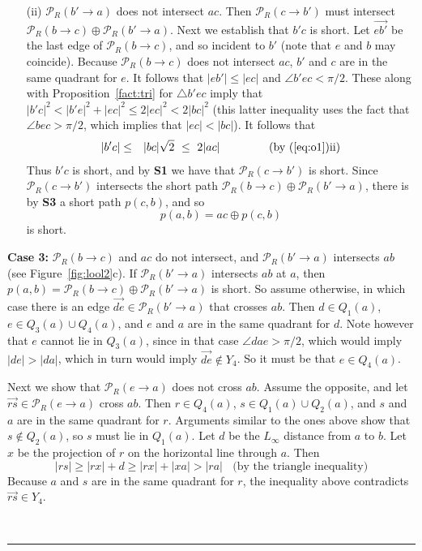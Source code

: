 \pdfoutput=1  \documentclass[11pt]{article}
\newcommand{\qed}{\rule{0.5em}{1.5ex}}
\newcommand{\fqed}{{\hfill~\qed}}
\newenvironment{proof}{{\noindent \bf Proof.}}
                      {{\hfill \fqed} \vspace{1em}}
\newcommand{\Pa}{{\mathcal P}}
\begin{document}
\begin{proof}
\begin{enumerate}
\item[(ii)] $\Pa_R(b' \rightarrow a)$ does not intersect $ac$.
Then $\Pa_R(c \rightarrow b')$ must intersect
$\Pa_R(b \rightarrow c) \oplus \Pa_R(b' \rightarrow a)$.
Next we establish that $b'c$ is short. Let $\overrightarrow{eb'}$ be the last edge
of $\Pa_R(b \rightarrow c)$, and so incident to $b'$
(note that $e$ and $b$ may coincide). Because $\Pa_R(b \rightarrow c)$ does not intersect
$ac$, $b'$ and $c$ are in the same quadrant for $e$. It follows that
$|eb'| \le |ec|$ and $\angle{b'ec} < \pi/2$.
These along with
Proposition~\ref{fact:tri}
for $\triangle b'ec$ imply that
$|b'c|^2 < |b'e|^2 + |ec|^2 \le 2|ec|^2 < 2|bc|^2$ (this latter inequality
uses the fact that $\angle{bec} > \pi/2$, which implies that $|ec| < |bc|$).
It follows that
\begin{eqnarray}
 |b'c| & \le & |bc| \sqrt{2} ~\le ~2|ac| ~~~~~~~~~~~~~\mbox{(by~(\ref{eq:o1})ii)}
\label{eq:o4a}
\end{eqnarray}
Thus $b'c$ is short, and by {\bf S1} we have that $\Pa_R(c \rightarrow b')$ is short.
Since $\Pa_R(c \rightarrow b')$ intersects the short path
$\Pa_R(b \rightarrow c) \oplus \Pa_R(b' \rightarrow a)$,
there is by {\bf S3} a short path $p(c,b)$, and so
$$
p(a,b) = ac \oplus p(c,b)
$$
is short.

\end{enumerate}

\medskip
\noindent
{\bf Case 3:} $\Pa_R(b \rightarrow c)$ and $ac$ do not intersect,
and $\Pa_R(b' \rightarrow a)$ intersects $ab$ (see Figure~\ref{fig:lool2}c).
If $\Pa_R(b' \rightarrow a)$ intersects $ab$ at $a$, then
$p(a,b) = \Pa_R(b \rightarrow c) \oplus \Pa_R(b' \rightarrow a)$ is short.
So assume otherwise, in which case
there is an edge $\overrightarrow{de} \in \Pa_R(b' \rightarrow a)$ that
crosses $ab$.
Then $d \in Q_1(a)$, $e \in Q_3(a) \cup Q_4(a)$, and $e$ and $a$ are in
the same quadrant for $d$. Note however that $e$ cannot lie in
$Q_3(a)$, since in that case $\angle{dae} > \pi/2$, which would imply
$|de| > |da|$, which in turn would imply $\overrightarrow{de} \notin Y_4$.
So it must be that $e \in Q_4(a)$.

Next we show that $\Pa_R(e \rightarrow a)$ does not cross $ab$. Assume the opposite,
and let $\overrightarrow{rs} \in \Pa_R(e \rightarrow a)$ cross $ab$. Then
$r \in Q_4(a)$, $s \in Q_1(a) \cup Q_2(a)$, and $s$ and $a$ are in
the same quadrant for $r$. Arguments similar to the ones above show that
$s \notin Q_2(a)$, so $s$ must lie in $Q_1(a)$. Let $d$ be the $L_\infty$
distance from $a$ to $b$. Let $x$ be the projection of $r$ on the horizontal
line through $a$. Then
\[
|rs| \ge |rx| + d \ge |rx| + |xa| > |ra| ~~~~\mbox{(by the triangle inequality)}
\]
Because $a$ and $s$ are in the same quadrant for $r$, the inequality above
contradicts $\overrightarrow{rs} \in Y_4$.


\end{proof}
\end{document}
